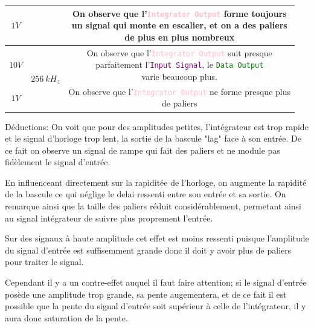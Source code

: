 \documentclass[11pt, openright]{book}
\begin{document}
\begin{center}
\begin{tabular}{c|c|c}
        \cline{1-1}\cline{3-3}
        $1V$            &                              & \makecell{On observe que l'\textcolor{pink}{\texttt{Integrator Output}} forme toujours                \\ un signal qui monte en escalier, et on a des paliers\\ de plus en plus nombreux}\\
        \hline
        $10V$           & \multirow{2}{*}{$256\ kH_z$} & \makecell{On observe que l'\textcolor{pink}{\texttt{Integrator Output}} suit presque                  \\ parfaitement l'\textcolor{purple}{\texttt{Input Signal}}, le \textcolor{green}{\texttt{Data Output}} \\varie beaucoup plus.}\\
        \cline{1-1}\cline{3-3}
        $1V$            &                              & \makecell{On observe que l'\textcolor{pink}{\texttt{Integrator Output}} ne forme presque plus         \\de paliers}\\
    \end{tabular}
\end{center}

\begin{dent}{Déductions:} On voit que pour des amplitudes petites, l'intégrateur est trop rapide et le signal d'horloge trop lent, la sortie de la bascule "lag" face à son entrée. De ce fait on observe un signal de rampe qui fait des paliers et ne module pas fidèlement le signal d'entrée.

    En influenceant directement sur la rapiditée de l'horloge, on augmente la rapidité de la bascule ce qui néglige le delai ressenti entre son entrée et sa sortie. On remarque ainsi que la taille des paliers réduit considérablement, permetant ainsi au signal intégrateur de suivre plus proprement l'entrée.

    Sur des signaux à haute amplitude cet effet est moins ressenti puisque l'amplitude du signal d'entrée est suffisemment grande donc il doit y avoir plus de paliers pour traiter le signal.

    Cependant il y a un contre-effet auquel il faut faire attention; si le signal d'entrée posède une amplitude trop grande, sa pente augementera, et de ce fait il est possible que la pente du signal d'entrée soit supérieur à celle de l'intégrateur, il y aura donc saturation de la pente.

\end{dent}
\end{document}
